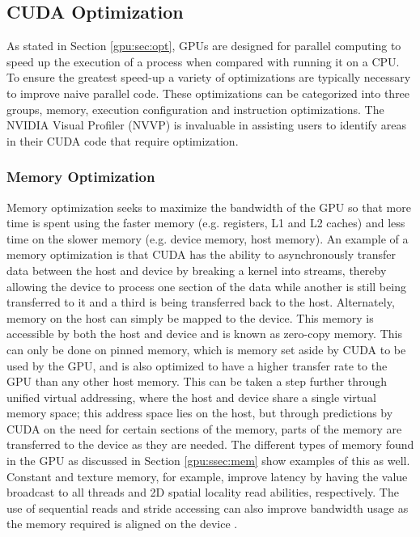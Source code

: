 \subsection{CUDA Optimization}\label{gpu:sec:cop}
As stated in Section \ref{gpu:sec:opt}, GPUs are designed for parallel computing to speed up the execution of a process when compared with running it on a CPU. To ensure the greatest speed-up a variety of optimizations are typically necessary to improve naive parallel code. These optimizations can be categorized into three groups, memory, execution configuration and instruction optimizations. The NVIDIA Visual Profiler (NVVP) is invaluable in assisting users to identify areas in their CUDA code that require optimization.
\subsubsection{Memory Optimization}
Memory optimization seeks to maximize the bandwidth of the GPU so that more time is spent using the faster memory (e.g. registers, L1 and L2 caches) and less time on the slower memory (e.g. device memory, host memory). An example of a memory optimization is that CUDA has the ability to asynchronously transfer data between the host and device by breaking a kernel into streams, thereby allowing the device to process one section of the data while another is still being transferred to it and a third is being transferred back to the host. Alternately, memory on the host can simply be mapped to the device. This memory is accessible by both the host and device and is known as zero-copy memory. This can only be done on pinned memory, which is memory set aside by CUDA to be used by the GPU, and is also optimized to have a higher transfer rate to the GPU than any other host memory. This can be taken a step further through unified virtual addressing, where the host and device share a single virtual memory space; this address space lies on the host, but through predictions by CUDA on the need for certain sections of the memory, parts of the memory are transferred to the device as they are needed. The different types of memory found in the GPU as discussed in Section \ref{gpu:ssec:mem} show examples of this as well. Constant and texture memory, for example, improve latency by having the value broadcast to all threads and 2D spatial locality read abilities, respectively. The use of sequential reads and stride accessing can also improve bandwidth usage as the memory required is aligned on the device \citep{CUDA}.
%

